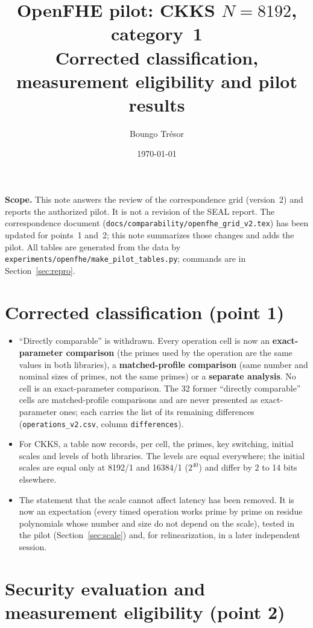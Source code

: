 \documentclass[11pt]{article}
\title{OpenFHE pilot: CKKS $N{=}8192$, category~1\\[2pt]
\large Corrected classification, measurement eligibility and pilot results}
\author{Boungo Tr\'esor}
\date{\today}
\begin{document}
\maketitle

\noindent\textbf{Scope.} This note answers the review of the correspondence grid (version~2) and reports the authorized pilot. It is not a revision of the SEAL report. The correspondence document (\texttt{docs/comparability/openfhe\_grid\_v2.tex}) has been updated for points~1 and~2; this note summarizes those changes and adds the pilot. All tables are generated from the data by \texttt{experiments/openfhe/make\_pilot\_tables.py}; commands are in Section~\ref{sec:repro}.

\section{Corrected classification (point 1)}

\begin{itemize}[leftmargin=*, itemsep=2pt]
  \item ``Directly comparable'' is withdrawn. Every operation cell is now an \textbf{exact-parameter comparison} (the primes used by the operation are the same values in both libraries), a \textbf{matched-profile comparison} (same number and nominal sizes of primes, not the same primes) or a \textbf{separate analysis}. No cell is an exact-parameter comparison. The 32 former ``directly comparable'' cells are matched-profile comparisons and are never presented as exact-parameter ones; each carries the list of its remaining differences (\texttt{operations\_v2.csv}, column \texttt{differences}).
  \item For CKKS, a table now records, per cell, the primes, key switching, initial scales and levels of both libraries. The levels are equal everywhere; the initial scales are equal only at 8192/1 and 16384/1 ($2^{40}$) and differ by 2 to 14 bits elsewhere.
  \item The statement that the scale cannot affect latency has been removed. It is now an expectation (every timed operation works prime by prime on residue polynomials whose number and size do not depend on the scale), tested in the pilot (Section~\ref{sec:scale}) and, for relinearization, in a later independent session.
\end{itemize}

\section{Security evaluation and measurement eligibility (point 2)}
\end{document}
